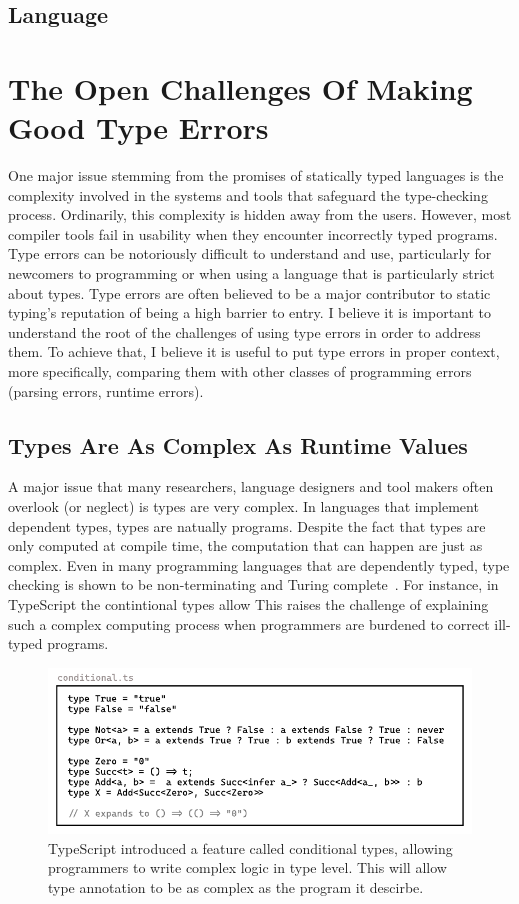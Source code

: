  \subsection{Language}


\section{The Open Challenges Of Making Good Type Errors}

One major issue stemming from the promises of statically typed languages is the complexity involved in the systems and tools that safeguard the type-checking process. Ordinarily, this complexity is hidden away from the users. However, most compiler tools fail in usability when they encounter incorrectly typed programs. Type errors can be notoriously difficult to understand and use, particularly for newcomers to programming or when using a language that is particularly strict about types. Type errors are often believed to be a major contributor to static typing's reputation of being a high barrier to entry. I believe it is important to understand the root of the challenges of using type errors in order to address them. To achieve that, I believe it is useful to put type errors in proper context, more specifically, comparing them with other classes of programming errors (parsing errors, runtime errors). 

\subsection{Types Are As Complex As Runtime Values}
A major issue that many researchers, language designers and tool makers often overlook (or neglect) is types are very complex. In languages that implement dependent types, types are natually programs. Despite the fact that types are only computed at compile time, the computation that can happen are just as complex. Even in many programming languages that are dependently typed, type checking is shown to be non-terminating and Turing complete~\cite{Wells1999-ob}. For instance, in TypeScript the contintional types allow  This raises the challenge of explaining such a complex computing process when programmers are burdened to correct ill-typed programs. 


\begin{figure}[hbt]
  \includegraphics[width=\linewidth]{Conditional}
  \caption{
    \label{fig:conditional}
   TypeScript introduced a feature called conditional types, allowing programmers to write complex logic in type level. This will allow type annotation to be as complex as the program it descirbe.
    }
\end{figure}

